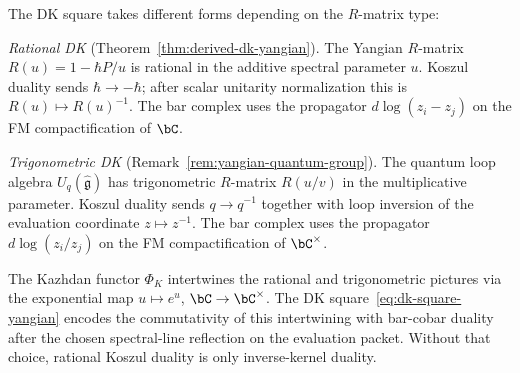 \begin{remark}
\label{rem:rational-trigonometric-dk}
The DK square takes different forms depending on the $R$-matrix type:

\emph{Rational DK}
\textup{(}Theorem~\textup{\ref{thm:derived-dk-yangian})}.
The Yangian $R$-matrix $R(u) = 1 - \hbar P/u$ is rational
in the additive spectral parameter $u$. Koszul duality sends
$\hbar \to -\hbar$; after scalar unitarity normalization this is
$R(u)\mapsto R(u)^{-1}$. The bar complex uses the propagator
$d\log(z_i - z_j)$ on the FM compactification of $\bC$.

\emph{Trigonometric DK}
\textup{(}Remark~\textup{\ref{rem:yangian-quantum-group})}.
The quantum loop algebra $U_q(\widehat{\mathfrak{g}})$ has
trigonometric $R$-matrix $R(u/v)$ in the multiplicative
parameter. Koszul duality sends $q \to q^{-1}$ together with
loop inversion of the evaluation coordinate $z\mapsto z^{-1}$.
The bar complex uses the propagator $d\log(z_i/z_j)$ on the FM
compactification of $\bC^\times$.

The Kazhdan functor $\Phi_K$ intertwines the rational and
trigonometric pictures via the exponential map $u \mapsto e^u$,
$\bC \to \bC^\times$. The DK
square~\eqref{eq:dk-square-yangian} encodes the commutativity
of this intertwining with bar-cobar duality after the chosen
spectral-line reflection on the evaluation packet. Without that
choice, rational Koszul duality is only inverse-kernel duality.
\end{remark}

